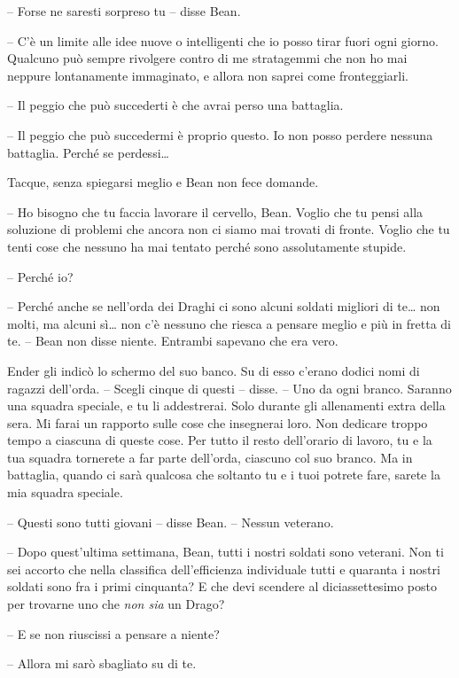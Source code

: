 {-- Forse ne saresti sorpreso tu -- disse Bean.}

{-- C'è un limite alle idee nuove o intelligenti che io posso tirar
	fuori ogni giorno. Qualcuno può sempre rivolgere contro di me
	stratagemmi che non ho mai neppure lontanamente immaginato, e allora non
	saprei come fronteggiarli.}

{-- Il peggio che può succederti è che avrai perso una battaglia.}

{-- Il peggio che può succedermi è proprio questo. Io non posso perdere
	nessuna battaglia. Perché se perdessi\ldots{}}

{Tacque, senza spiegarsi meglio e Bean non fece domande.}

{-- Ho bisogno che tu faccia lavorare il cervello, Bean. Voglio che tu
	pensi alla soluzione di problemi che ancora non ci siamo mai trovati di
	fronte. Voglio che tu tenti cose che nessuno ha mai tentato perché sono
	assolutamente stupide.}

{-- Perché io?}

{-- Perché anche se nell'orda dei Draghi ci sono alcuni soldati migliori
	di te\ldots{} non molti, ma alcuni sì\ldots{} non c'è nessuno che riesca
	a pensare meglio e più in fretta di te. -- Bean non disse niente.
	Entrambi sapevano che era vero.}

{Ender gli indicò lo schermo del suo banco. Su di esso c'erano dodici
	nomi di ragazzi dell'orda. -- Scegli cinque di questi -- disse. -- Uno
	da ogni branco. Saranno una squadra speciale, e tu li addestrerai. Solo
	durante gli allenamenti extra della sera. Mi farai un rapporto sulle
	cose che insegnerai loro. Non dedicare troppo tempo a ciascuna di queste
	cose. Per tutto il resto dell'orario di lavoro, tu e la tua squadra
	tornerete a far parte dell'orda, ciascuno col suo branco. Ma in
	battaglia, quando ci sarà qualcosa che soltanto tu e i tuoi potrete
	fare, sarete la mia squadra speciale.}

{-- Questi sono tutti giovani -- disse Bean. -- Nessun veterano.}

{-- Dopo quest'ultima settimana, Bean, tutti i nostri soldati sono
	veterani. Non ti sei accorto che nella classifica dell'efficienza
	individuale tutti e quaranta i nostri soldati sono fra i primi
	cinquanta? E che devi scendere al diciassettesimo posto per trovarne uno
	che \emph{non sia} un Drago?}

{-- E se non riuscissi a pensare a niente?}

{-- Allora mi sarò sbagliato su di te.}

